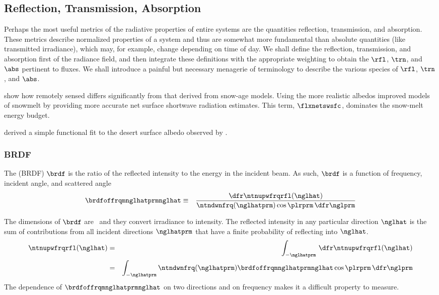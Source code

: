 \documentclass[12pt]{article}
\begin{document}
\subsection[Reflection, Transmission, Absorption]{Reflection, Transmission, Absorption}\label{sxn:rta}
Perhaps the most useful metrics of the radiative properties 
of entire systems are the quantities reflection, transmission, and
absorption. 
These metrics describe normalized properties of a system and thus
are somewhat more fundamental than absolute quantities (like
transmitted irradiance), which may, for example, change depending on
time of day. 
We shall define the reflection, transmission, and absorption first
of the radiance field, and then integrate these definitions with
the appropriate weighting to obtain the $\rfl$, $\trn$, and $\abs$
pertinent to fluxes.
We shall introduce a painful but necessary menagerie of terminology
to describe the various species of $\rfl$, $\trn$, and $\abs$.

\cite{MPB04} show how remotely sensed 
differs significantly from that derived from snow-age models.
Using the more realistic albedos improved models of snowmelt by 
providing more accurate net surface shortwave radiation estimates. 
This term, $\flxnetswsfc$, dominates the snow-melt energy budget.

\cite{WBZ05} derived a simple functional fit to the desert surface
albedo observed by .

\subsubsection[BRDF]{BRDF}\label{sxn:BRDF}
The  (BRDF)
$\brdf$ is the ratio of the reflected intensity to the energy in the
incident beam. 
As such, $\brdf$ is a function of frequency, incident angle, and
scattered angle
\begin{eqnarray}
\brdfoffrqmnglhatprmnglhat & \equiv & 
\frac{\dfr\ntnupwfrqrfl(\nglhat)}{\ntndwnfrq(\nglhatprm) \cos \plrprm \,\dfr\nglprm}
\label{eqn:brdf_dfn}
\end{eqnarray}

The dimensions of $\brdf$ are \xsr\ and they convert irradiance to
intensity. 
The reflected intensity in any particular direction $\nglhat$ is the
sum of contributions from all incident directions $\nglhatprm$ that
have a finite probability of reflecting into $\nglhat$.
\begin{eqnarray}
\ntnupwfrqrfl(\nglhat) 
& = & 
\int_{-\nglhatprm} \,\dfr\ntnupwfrqrfl(\nglhat)
\nonumber \\
& = & 
\int_{-\nglhatprm} 
\ntndwnfrq(\nglhatprm) \brdfoffrqmnglhatprmnglhat \cos \plrprm
\,\dfr\nglprm
\label{eqn:ntn_upw_frq_rfl_dfn}
\end{eqnarray}
The dependence of $\brdfoffrqmnglhatprmnglhat$ on two directions and
on frequency makes it a difficult property to measure.
\end{document}
